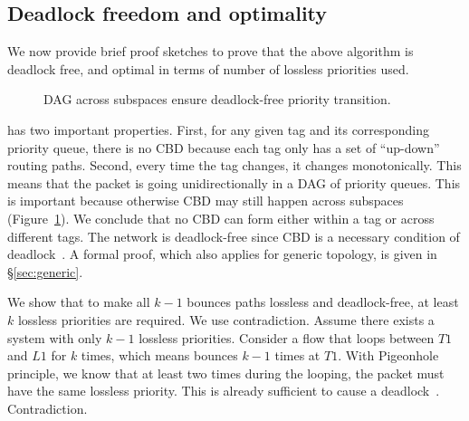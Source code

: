 \subsection {Deadlock freedom and optimality}
\label{subsec:specific_deadlock_free}

We now provide brief proof sketches to prove that the above algorithm is
deadlock free, and optimal in terms of number of lossless priorities used.

\begin{figure}[t]
	\centering
	
	
	\caption{DAG across subspaces ensure deadlock-free priority transition.}\label{fig:subspace}
\end{figure}

 \sysname{} has two
important properties. First, for any given tag and its corresponding priority
queue, there is no CBD because each tag only has a set of ``up-down'' routing
paths.  Second, every time the tag changes, it changes monotonically. This means
that the packet is going unidirectionally in a DAG of priority queues. This is
important because otherwise CBD may still happen across subspaces
(Figure~\ref{fig:subspace}).  We conclude that no CBD can form either within a
tag or across different tags.  The network is deadlock-free since CBD is a
necessary condition of deadlock~\cite{our_hotnets_paper}.  A formal proof, which
also applies for generic topology, is given in \S\ref{sec:generic}. 

 We show that
to make all $k-1$ bounces paths lossless and deadlock-free, at least $k$
lossless priorities are required. We use contradiction.  Assume there exists a
system with only $k-1$ lossless priorities. Consider a flow that loops between
$T1$ and $L1$ for $k$ times, which means bounces $k-1$ times at $T1$. With
Pigeonhole principle, we know that at least two times during the looping, the
packet must have the same lossless priority. This is already sufficient to cause
a deadlock~\cite{our_hotnets_paper}. Contradiction.

